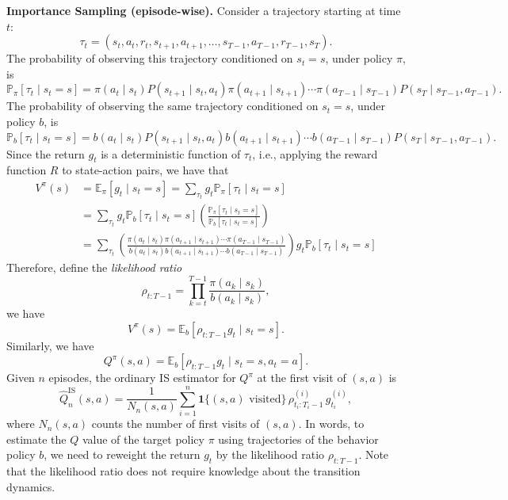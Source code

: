 \documentclass[
]{book}
\theoremstyle{definition}
\theoremstyle{definition}
\theoremstyle{definition}
\theoremstyle{definition}
\theoremstyle{remark}
\begin{document}
\textbf{Importance Sampling (episode-wise).} Consider a trajectory starting at time \(t\):
\[
\tau_t = (s_t, a_t, r_t, s_{t+1}, a_{t+1}, \dots, s_{T-1}, a_{T-1}, r_{T-1}, s_T).
\]
The probability of observing this trajectory conditioned on \(s_t = s\), under policy \(\pi\), is
\[
\mathbb{P}_{\pi}[\tau_t \mid s_t = s] = \pi(a_t \mid s_t) P(s_{t+1} \mid s_t, a_t) \pi(a_{t+1} \mid s_{t+1}) \cdots \pi(a_{T-1} \mid s_{T-1}) P(s_T \mid s_{T-1}, a_{T-1}).
\]
The probability of observing the same trajectory conditioned on \(s_t = s\), under policy \(b\), is
\[
\mathbb{P}_{b}[\tau_t \mid s_t = s] = b(a_t \mid s_t) P(s_{t+1} \mid s_t, a_t) b(a_{t+1} \mid s_{t+1}) \cdots b(a_{T-1} \mid s_{T-1}) P(s_T \mid s_{T-1}, a_{T-1}).
\]
Since the return \(g_t\) is a deterministic function of \(\tau_t\), i.e., applying the reward function \(R\) to state-action pairs, we have that
\begin{equation}
\begin{split}
V^\pi (s) & = \mathbb{E}_{\pi}[g_t \mid s_t = s] = \sum_{\tau_t} g_t \mathbb{P}_\pi [\tau_t \mid s_t = s] \\
& = \sum_{\tau_t} g_t \mathbb{P}_b[\tau_t \mid s_t = s] \left(\frac{\mathbb{P}_\pi [\tau_t \mid s_t = s]}{\mathbb{P}_b[\tau_t \mid s_t = s]} \right) \\
& = \sum_{\tau_t} \left( \frac{\pi(a_t \mid s_t) \pi(a_{t+1} \mid s_{t+1}) \cdots \pi(a_{T-1} \mid s_{T-1}) }{b(a_t \mid s_t)  b(a_{t+1} \mid s_{t+1}) \cdots b(a_{T-1} \mid s_{T-1})} \right) g_t \mathbb{P}_b [\tau_t \mid s_t = s]
\end{split}
\label{eq:IS-Trajectory-LikelihoodRatio}
\end{equation}
Therefore, define the \emph{likelihood ratio}
\begin{equation}
\rho_{t:T-1} = \prod_{k=t}^{T-1} \frac{\pi(a_k \mid s_k)}{b(a_k \mid s_k)},
\label{eq:IS-LikelihoodRatio}
\end{equation}
we have
\begin{equation}
V^\pi(s) = \mathbb{E}_b\left[\rho_{t:T-1} g_t \mid s_t=s\right]. 
\label{eq:IS-Value}
\end{equation}
Similarly, we have
\begin{equation}
Q^\pi(s,a) =  \mathbb{E}_b\!\left[\rho_{t:T-1} g_t \mid s_t=s, a_t=a\right].
\label{eq:IS-ActionValue}
\end{equation}
Given \(n\) episodes, the ordinary IS estimator for \(Q^\pi\) at the first visit of \((s,a)\) is
\[
\hat Q_n^{\text{IS}}(s,a) = \frac{1}{N_n(s,a)} \sum_{i=1}^n \mathbf{1}\{(s,a)\text{ visited}\}\, \rho_{t_i:T_i-1}^{(i)}\, g_{t_i}^{(i)},
\]
where \(N_n(s,a)\) counts the number of first visits of \((s,a)\). In words, to estimate the \(Q\) value of the target policy \(\pi\) using trajectories of the behavior policy \(b\), we need to reweight the return \(g_t\) by the likelihood ratio \(\rho_{t:T-1}\). Note that the likelihood ratio does not require knowledge about the transition dynamics.
\end{document}

